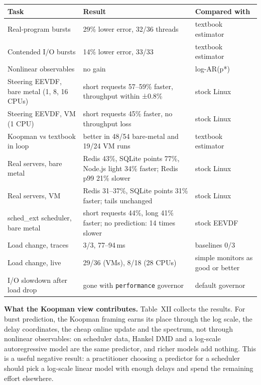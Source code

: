 \documentclass{article}
\begin{document}
\begin{tabular}{p{4.2cm}p{6.6cm}p{3.6cm}}
\toprule
Task & Result & Compared with \\
\midrule
Real-program bursts & 29\% lower error, 32/36 threads & textbook estimator \\
Contended I/O bursts & 14\% lower error, 33/33 & textbook estimator \\
Nonlinear observables & no gain & log-AR(p*) \\
Steering EEVDF, bare metal (1, 8, 16 CPUs) & short requests 57--59\% faster, throughput within ±0.8\% & stock Linux \\
Steering EEVDF, VM (1 CPU) & short requests 45\% faster, no throughput loss & stock Linux \\
Koopman vs textbook in loop & better in 48/54 bare-metal and 19/24 VM runs & textbook estimator \\
Real servers, bare metal & Redis 43\%, SQLite points 77\%, Node.js light 34\% faster; Redis p99 21\% slower & stock Linux \\
Real servers, VM & Redis 31--37\%, SQLite points 31\% faster; tails unchanged & stock Linux \\
sched\_ext scheduler, bare metal & short requests 44\%, long 41\% faster; no prediction: 14 times slower & stock EEVDF \\
Load change, traces & 3/3, 77--94\,ms & baselines 0/3 \\
Load change, live & 29/36 (VMs), 8/18 (28 CPUs) & simple monitors as good or better \\
I/O slowdown after load drop & gone with \texttt{performance} governor & default governor \\
\bottomrule
\end{tabular}




\textbf{What the Koopman view contributes.} Table~XII collects the results. For burst prediction, the Koopman framing earns its place through the log scale, the delay coordinates, the cheap online update and the spectrum, not through nonlinear observables: on scheduler data, Hankel DMD and a log-scale autoregressive model are the same predictor, and richer models add nothing. This is a useful negative result: a practitioner choosing a predictor for a scheduler should pick a log-scale linear model with enough delays and spend the remaining effort elsewhere.
\end{document}
